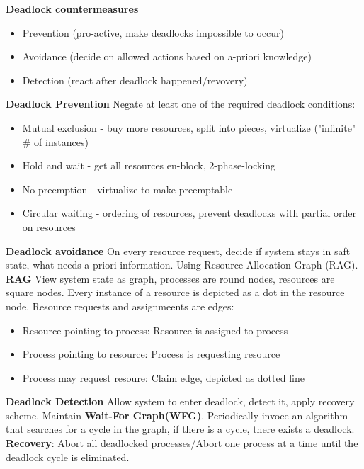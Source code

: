 \documentclass[11pt,a4paper]{article}
\begin{document}
	\textbf{Deadlock countermeasures}
	\begin{itemize}
		\item Prevention (pro-active, make deadlocks impossible to occur)
		\item Avoidance (decide on allowed actions based on a-priori knowledge)
		\item Detection (react after deadlock happened/revovery)
	\end{itemize}
	
	\textbf{Deadlock Prevention} \newline
	Negate at least one of the required deadlock conditions:
	\begin{itemize}
		\item Mutual exclusion - buy more resources, split into pieces, virtualize ("infinite" \# of instances)
		\item Hold and wait - get all resources en-block, 2-phase-locking
		\item No preemption - virtualize to make preemptable
		\item Circular waiting - ordering of resources, prevent deadlocks with partial order on resources
	\end{itemize}
	
	\textbf{Deadlock avoidance} \newline
	On every resource request, decide if system stays in saft state, what needs a-priori information. Using Resource Allocation Graph (RAG).\newline
	\textbf{RAG}
	View system state as graph, processes are round nodes, resources are square nodes. Every instance of a resource is depicted as a dot in the resource node.\newline
	Resource requests and assignmeents are edges:
	\begin{itemize}
		\item Resource pointing to process: Resource is assigned to process
		\item Process pointing to resource: Process is requesting resource
		\item Process may request resoure: Claim edge, depicted as dotted line
	\end{itemize}
	
	\textbf{Deadlock Detection}
	Allow system to enter deadlock, detect it, apply recovery scheme. \newline
	Maintain \textbf{Wait-For Graph(WFG)}. Periodically invoce an algorithm that searches for a cycle in the graph, if there is a cycle, there exists a deadlock.\newline
	\textbf{Recovery}: Abort all deadlocked processes/Abort one process at a time until the deadlock cycle is eliminated. \newline
	
\end{document}
